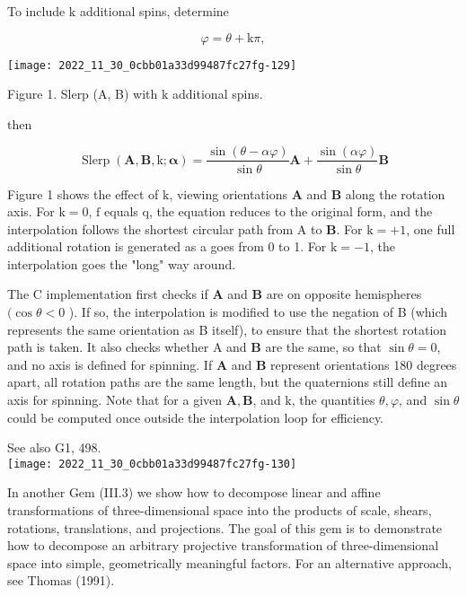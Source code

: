 To include $\mathrm{k}$ additional spins, determine

$$
\varphi=\theta+\mathrm{k} \pi,
$$


\begin{center}
\texttt{[image: 2022\_11\_30\_0cbb01a33d99487fc27fg-129]}
\end{center}

Figure 1. Slerp (A, B) with $\mathrm{k}$ additional spins.

then

$$
\operatorname{Slerp}(\mathbf{A}, \mathbf{B}, \mathrm{k} ; \boldsymbol{\alpha})=\frac{\sin (\theta-\alpha \varphi)}{\sin \theta} \mathbf{A}+\frac{\sin (\alpha \varphi)}{\sin \theta} \mathbf{B}
$$

Figure 1 shows the effect of $\mathrm{k}$, viewing orientations $\mathbf{A}$ and $\mathbf{B}$ along the rotation axis. For $\mathrm{k}=0$, $\mathrm{f}$ equals $\mathrm{q}$, the equation reduces to the original form, and the interpolation follows the shortest circular path from A to $\mathbf{B}$. For $\mathrm{k}=+1$, one full additional rotation is generated as a goes from 0 to 1. For $\mathrm{k}=-1$, the interpolation goes the "long" way around.

The C implementation first checks if $\mathbf{A}$ and $\mathbf{B}$ are on opposite hemispheres $(\cos \theta<0$ ). If so, the interpolation is modified to use the negation of B (which represents the same orientation as B itself), to ensure that the shortest rotation path is taken. It also checks whether A and $\mathbf{B}$ are the same, so that $\sin \theta=0$, and no axis is defined for spinning. If $\mathbf{A}$ and $\mathbf{B}$ represent orientations 180 degrees apart, all rotation paths are the same length, but the quaternions still define an axis for spinning. Note that for a given $\mathbf{A}, \mathbf{B}$, and $\mathrm{k}$, the quantities $\theta, \varphi$, and $\sin \theta$ could be computed once outside the interpolation loop for efficiency.

See also G1, 498.\\
\texttt{[image: 2022\_11\_30\_0cbb01a33d99487fc27fg-130]}

In another Gem (III.3) we show how to decompose linear and affine transformations of three-dimensional space into the products of scale, shears, rotations, translations, and projections. The goal of this gem is to demonstrate how to decompose an arbitrary projective transformation of three-dimensional space into simple, geometrically meaningful factors. For an alternative approach, see Thomas (1991).

